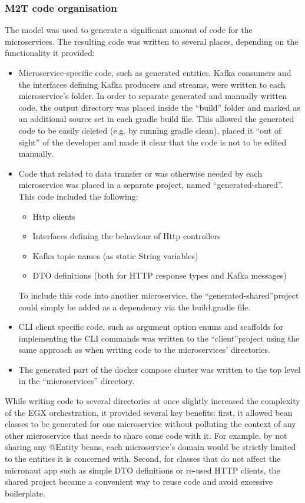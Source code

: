 \documentclass[parskip=full]{article}
\begin{document}
    \subsubsection{M2T code organisation}
    The model was used to generate a significant amount of code for the microservices.
    The resulting code was written to several places, depending on the functionality it provided:
    \begin{itemize}
        \item	Microservice-specific code, such as generated entities, Kafka consumers and the interfaces defining Kafka producers and streams, were written to each microservice's folder.
        In order to separate generated and manually written code, the output directory was placed inside the ``build'' folder and marked as an additional source set in each gradle build file.
        This allowed the generated code to be easily deleted (e.g. by running gradle clean), placed it ``out of sight'' of the developer and made it clear that the code is not to be edited manually.
        \item	Code that related to data transfer or was otherwise needed by each microservice was placed in a separate project, named ``generated-shared''.
        This code included the following:
        \begin{itemize}
            \item	Http clients
            \item	Interfaces defining the behaviour of Http controllers
            \item	Kafka topic names (as static String variables)
            \item	DTO definitions (both for HTTP response types and Kafka messages)
        \end{itemize}
        To include this code into another microservice, the ``generated-shared''project could simply be added as a dependency via the build.gradle file.
        \item	CLI client specific code, such as argument option enums and scaffolds for implementing the CLI commands was written to the ``client''project using the same approach as when writing code to the microservices' directories.
        \item	The generated part of the docker compose cluster was written to the top level in the ``microservices'' directory.
    \end{itemize}
    While writing code to several directories at once slightly increased the complexity of the EGX orchestration, it provided several key benefits: first, it allowed bean classes to be generated for one microservice without polluting the context of any other microservice that needs to share some code with it.
    For example, by not sharing any @Entity beans, each microservice's domain would be strictly limited to the entities it is concerned with.
    Second, for classes that do not affect the micronaut app such as simple DTO definitions or re-used HTTP clients, the shared project became a convenient way to reuse code and avoid excessive boilerplate.
\end{document}
